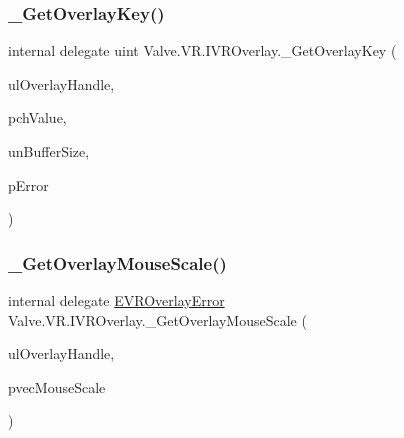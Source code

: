 \mbox{\label{struct_valve_1_1_v_r_1_1_i_v_r_overlay_a38178110dc53cc8ae5a125e70ab89203}} 
\subsubsection{\texorpdfstring{\_GetOverlayKey()}{\_GetOverlayKey()}}
{\footnotesize\ttfamily internal delegate uint Valve.\+V\+R.\+I\+V\+R\+Overlay.\+\_\+\+Get\+Overlay\+Key (\begin{DoxyParamCaption}\item[{ulong}]{ul\+Overlay\+Handle,  }\item[{System.\+Text.\+String\+Builder}]{pch\+Value,  }\item[{uint}]{un\+Buffer\+Size,  }\item[{ref \mbox{\hyperlink{namespace_valve_1_1_v_r_aaee5c5144f42b7969d45b854f51b0c18}{E\+V\+R\+Overlay\+Error}}}]{p\+Error }\end{DoxyParamCaption})}

\mbox{\label{struct_valve_1_1_v_r_1_1_i_v_r_overlay_a2b69731883d25838d42be3fe85fa64b0}} 
\subsubsection{\texorpdfstring{\_GetOverlayMouseScale()}{\_GetOverlayMouseScale()}}
{\footnotesize\ttfamily internal delegate \mbox{\hyperlink{namespace_valve_1_1_v_r_aaee5c5144f42b7969d45b854f51b0c18}{E\+V\+R\+Overlay\+Error}} Valve.\+V\+R.\+I\+V\+R\+Overlay.\+\_\+\+Get\+Overlay\+Mouse\+Scale (\begin{DoxyParamCaption}\item[{ulong}]{ul\+Overlay\+Handle,  }\item[{ref \mbox{\hyperlink{struct_valve_1_1_v_r_1_1_hmd_vector2__t}{Hmd\+Vector2\+\_\+t}}}]{pvec\+Mouse\+Scale }\end{DoxyParamCaption})}

\mbox{\label{struct_valve_1_1_v_r_1_1_i_v_r_overlay_ac81c5dd576fe54477b02122fbad65a6b}} 

